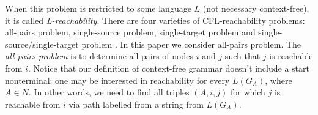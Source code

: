 When this problem is restricted to some language $L$ (not necessary context-free), it is called \textit{L-reachability}. There are four varieties of CFL-reachability problems: all-pairs problem, single-source problem, single-target problem and single-source/single-target problem \cite{RepsBasic}. In this paper we consider all-pairs problem. The \textit{all-pairs problem} is to determine all pairs of nodes $i$ and $j$ such that $j$ is reachable from $i$. Notice that our definition of context-free grammar doesn't include a start nonterminal: one may be interested in reachability for every $L(G_A)$, where $A \in N$. In other words, we need to find all triples $(A, i, j)$ for which $j$ is reachable from $i$ via path labelled from a string from $L(G_A)$.


